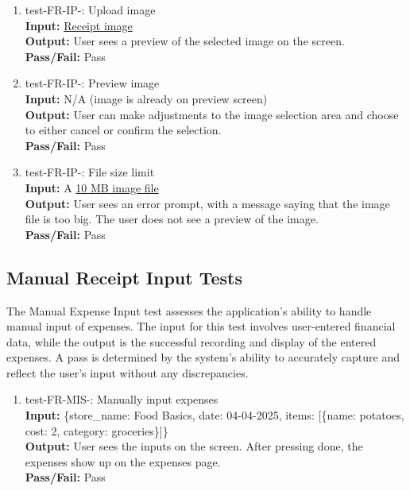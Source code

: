 \documentclass[12pt, titlepage]{article}
\begin{document}
\begin{enumerate}
  \item test-FR-IP-: Upload image\\\label{test-FR-IP-1}
    \textbf{Input:}
    \href{https://github.com/PlutosCapstone/Plutos/blob/main/src/server/tests/imageProcessing/data/parsing/input/foodbasics_1.jpg}{Receipt
    image}\\
    \textbf{Output:} User sees a preview of the selected image on the screen.\\
    \textbf{Pass/Fail:} Pass\\
  \item test-FR-IP-: Preview image\\
    \textbf{Input:} N/A (image is already on preview screen) \\
    \textbf{Output:} User can make adjustments to the image selection area and
    choose to either cancel or confirm the selection.\\
    \textbf{Pass/Fail:} Pass\\
  \item test-FR-IP-: File size limit\\
    \textbf{Input:} A
    \href{https://sample-videos.com/img/Sample-jpg-image-10mb.jpg}{10 MB image
    file}\\
    \textbf{Output:} User sees an error prompt, with a message saying that the
    image file is too big. The user does not see a preview of the image.\\
    \textbf{Pass/Fail:} Pass\\
\end{enumerate}

\subsection{Manual Receipt Input Tests}
The Manual Expense Input test assesses the application’s ability to handle manual 
input of expenses. The input for this test involves user-entered financial data, while the 
output is the successful recording and display of the entered expenses. A pass is determined 
by the system's ability to accurately capture and reflect the user's input without any 
discrepancies.

\begin{enumerate}\label{sec:FR-MIS}
  \item test-FR-MIS-: Manually input expenses\\
    \textbf{Input:} \{store\_name: Food Basics, date: 04-04-2025, items: [\{name:
    potatoes, cost: 2, category: groceries\}]\}\\
    \textbf{Output:} User sees the inputs on the screen. After pressing done,
    the expenses show up on the expenses page.\\
    \textbf{Pass/Fail:} Pass\\
\end{enumerate}
\end{document}
